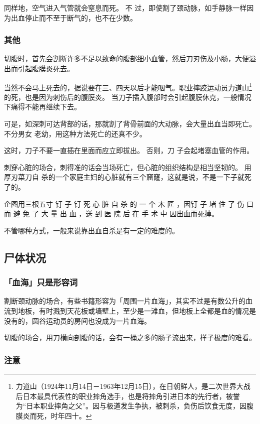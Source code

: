 \documentclass[UTF8]{ctexart}
\begin{document}
同样地，空气进入气管就会窒息而死。
不 过，即使割了颈动脉，如手静脉一样因为出血停止而不至于断气的，也不在少数。

\subsubsection{其他}

切腹时，首先会割断许多不足以致命的腹部细小血管，然后刀刃伤及小肠，大便溢出而引起腹膜炎死去。

当然不会马上死去的，据说要在三、四天以后才能咽气。职业摔跤运动员力道山\footnote{力道山（1924年11月14日－1963年12月15日），在日朝鲜人，是二次世界大战后日本最具代表性的职业摔角选手，也是将摔角引进日本的先行者，被誉为“日本职业摔角之父”。因与极道发生争执，被刺杀，负伤后饮食无度，因腹膜炎而死，时年四十。}的死，也是因为刺伤后的腹膜炎。
当刀子插入腹部时会引起腹膜休克，一般情况下痛得不能再继续下去。

可是，如深刺可达背部的话，那就割了背骨前面的大动脉，会大量出血当即死亡。
不分男女 老幼，用这种方法死亡的还真不少。

这时，刀子不要一直插在里面而应立即拔出。
否则，刀 子会起堵塞血管的作用。 

刺穿心脏的场合，刺得准的话会当场死亡，但心脏的组织结构是相当坚韧的。
用厚刃菜刀自 杀的一个家庭主妇的心脏就有三个窟窿，这就是说，不是一下子就死了的。

企图用三根五寸 钉 子 钉 死 心 脏 自 杀 的 一 个 木 匠 ，因钉 子 堵 住 了 伤 口 而 避 免 了 大 量 出 血 ，送 到 医 院 后 在 手 术 中 因出血而死掉。

不管哪种方式，一般来说靠出血自杀是有一定的难度的。

\subsection{尸体状况}

\subsubsection*{「血海」只是形容词}

割断颈动脉的场合，有些书籍形容为「周围一片血海」，其实不过是有数公升的血流到地板，有时溅到天花板或墙壁上，至少是一滩血，但地板上全都是血的情况是没有的，圆谷运动员的房间也没成为一片血海。

切腹的场合，用刀横向剖腹的话，会有一桶之多的肠子流出来，样子极度的难看。

\subsubsection*{注意}
\end{document}
